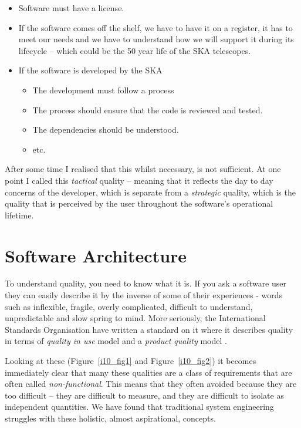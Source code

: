 \documentclass[11pt,twoside]{article}
\begin{document}
\begin{itemize}
\item Software must have a license.
\item If the software comes off the shelf, we have to have it on a register, it has to meet our needs and we have to understand how we will support it during its lifecycle -- which could be the 50 year life of the SKA telescopes.
\item If the software is developed by the SKA
	\begin{itemize}
	\item The development must follow a process
	\item The process should ensure that the code is reviewed and tested.
	\item The dependencies should be understood.
	\item etc.
	\end{itemize}
\end{itemize}

After some time I realised that this whilst necessary, is not sufficient. At one point I called this \emph{tactical} 
quality -- meaning that it reflects the day to day concerns of the developer, which is separate from a 
\emph{strategic} quality, which is the quality that is perceived by the user throughout the software's operational 
lifetime. 


\section{Software Architecture} %
\label{sec:software_architecture}
To understand quality, you need to know what it is. If you ask a software user they can easily describe it by the 
inverse of some of their experiences - words such as inflexible, fragile, overly complicated, difficult to 
understand, unpredictable and slow spring to mind. More seriously, the International Standards Organisation have 
written a standard on it where it describes quality in terms of \emph{quality in use} model and a \emph{product quality} 
model \citep[see][]{iso25010}. 



Looking at these (Figure~\ref{i10_fig1} and Figure~\ref{i10_fig2}) it becomes immediately clear that many these 
qualities are a class of requirements that are often called \emph{non-functional}. This means that they often avoided 
because they are too difficult -- they are difficult 
to measure, and they are difficult to isolate as independent quantities. We have found 
that traditional system engineering struggles with these holistic, almost aspirational, 
concepts. 
\end{document}
